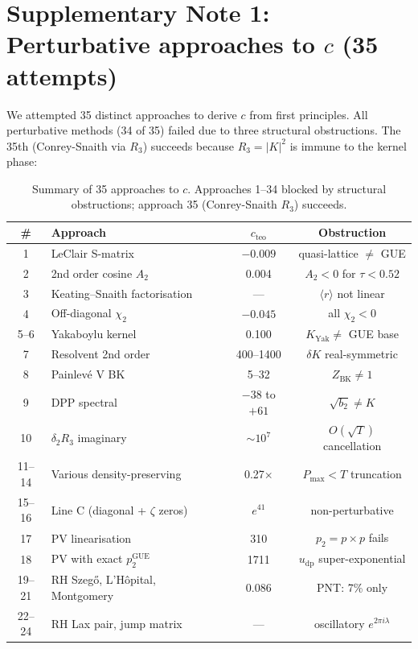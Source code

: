 \documentclass[10pt]{article}
\begin{document}
\section{Supplementary Note 1: Perturbative approaches to $c$ (35 attempts)}

We attempted 35 distinct approaches to derive $c$ from first
principles. All perturbative methods (34 of 35) failed due to three
structural obstructions. The 35th (Conrey-Snaith via $R_3$) succeeds
because $R_3 = |K|^2$ is immune to the kernel phase:

\begin{table}[h]
\centering
\caption{Summary of 35 approaches to $c$. Approaches 1--34 blocked by
structural obstructions; approach 35 (Conrey-Snaith $R_3$) succeeds.}
\label{tab:29approaches}
\begin{tabular}{clcc}
\toprule
\# & Approach & $c_{\mathrm{teo}}$ & Obstruction \\
\midrule
1 & LeClair S-matrix & $-0.009$ & quasi-lattice $\neq$ GUE \\
2 & 2nd order cosine $A_2$ & 0.004 & $A_2 < 0$ for $\tau < 0.52$ \\
3 & Keating--Snaith factorisation & --- & $\langle r\rangle$ not linear \\
4 & Off-diagonal $\chi_2$ & $-0.045$ & all $\chi_2 < 0$ \\
5--6 & Yakaboylu kernel & 0.100 & $K_{\mathrm{Yak}} \neq$ GUE base \\
7 & Resolvent 2nd order & 400--1400 & $\delta K$ real-symmetric \\
8 & Painlev\'e V BK & 5--32 & $Z_{\mathrm{BK}} \neq 1$ \\
9 & DPP spectral & $-38$ to $+61$ & $\sqrt{b_2} \neq K$ \\
10 & $\delta_2 R_3$ imaginary & $\sim 10^7$ & $O(\sqrt{T})$ cancellation \\
11--14 & Various density-preserving & 0.27$\times$ & $P_{\max} < T$ truncation \\
15--16 & Line C (diagonal + $\zeta$ zeros) & $e^{41}$ & non-perturbative \\
17 & PV linearisation & 310 & $p_2 = p \times p$ fails \\
18 & PV with exact $p_2^{\mathrm{GUE}}$ & 1711 & $u_{\mathrm{dp}}$ super-exponential \\
19--21 & RH Szeg\H{o}, L'H\^opital, Montgomery & 0.086 & PNT: 7\% only \\
22--24 & RH Lax pair, jump matrix & --- & oscillatory $e^{2\pi i\lambda}$ \\

\end{tabular}
\end{table}
\end{document}
